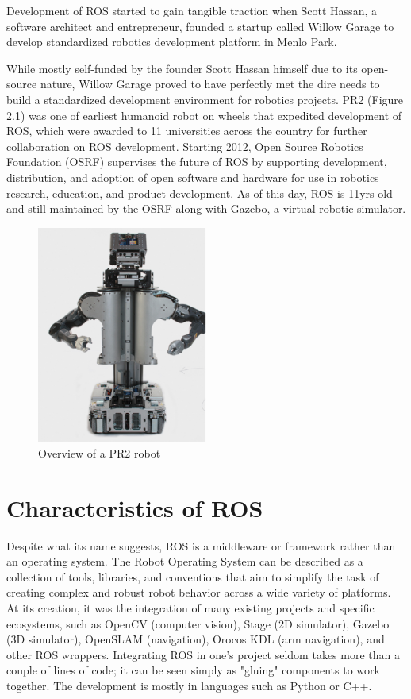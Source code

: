 \documentclass[twoside]{article}
\begin{document}
Development of ROS started to gain tangible traction when Scott Hassan, a software architect and entrepreneur, founded a startup called Willow Garage to develop standardized robotics development platform in Menlo Park.

While mostly self-funded by the founder Scott Hassan himself due to its open-source nature, Willow Garage proved to have perfectly met the dire needs to build a standardized development environment for robotics projects. PR2 (Figure 2.1) was one of earliest humanoid robot on wheels that expedited development of ROS, which were awarded to 11 universities across the country for further collaboration on ROS development.
Starting 2012, Open Source Robotics Foundation (OSRF) supervises the future of ROS by supporting development, distribution, and adoption of open software and hardware for use in robotics research, education, and product development. As of this day, ROS is 11yrs old and still maintained by the OSRF along with Gazebo, a virtual robotic simulator.
\begin{figure}[ht]\label{fig:1}
\centering
\includegraphics[width=0.5\textwidth]{PR2}
\caption{Overview of a PR2 robot}
\end{figure}

\section{Characteristics of ROS}\label{characteristics}\label{sec:characteristics}
Despite what its name suggests, ROS is a middleware or framework rather than an operating system. The Robot Operating System can be described as a collection of tools, libraries, and conventions that aim to simplify the task of creating complex and robust robot behavior across a wide variety of platforms. At its creation, it was the integration of many existing projects and specific ecosystems, such as OpenCV (computer vision), Stage (2D simulator), Gazebo (3D simulator), OpenSLAM (navigation), Orocos KDL (arm navigation), and other ROS wrappers. Integrating ROS in one's project seldom takes more than a couple of lines of code; it can be seen simply as "gluing" components to work together. The development is mostly in languages such as Python or C++.
\end{document}

